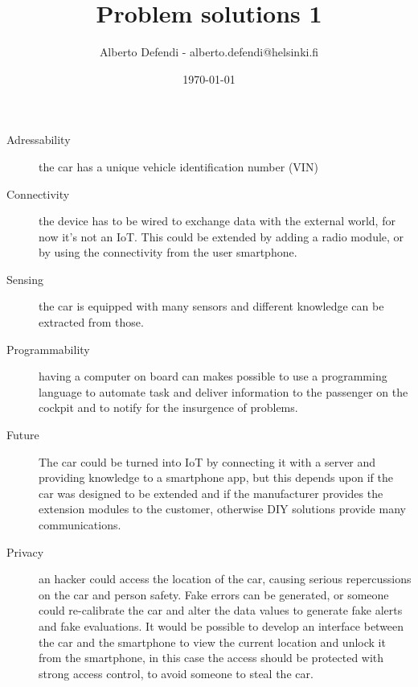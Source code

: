 \documentclass[a4paper, 12pt]{article}
\title{Problem solutions 1}
\author{Alberto Defendi - alberto.defendi@helsinki.fi}
\date{\today}
\begin{document}
\maketitle

\section{} %
\label{sec:}
\subsection{} %
\label{sub:}

\begin{description}
	\item[Adressability] the car has a unique vehicle identification number (VIN)
	\item[Connectivity] the device has to be wired to exchange data with the
		external world, for now it's not an IoT. This could be extended by
		adding a radio module, or by using the connectivity from the user
		smartphone. 
	\item[Sensing] the car is equipped with many sensors and different knowledge
		can be extracted from those.
    \item[Programmability] having a computer on board can makes possible to use
		a programming language to automate task and deliver information to the
		passenger on the cockpit and to notify for the insurgence of problems. 
	\item[Future] The car could be turned into IoT by connecting it with a
		server and providing knowledge to a smartphone app, but this depends
		upon if the car was designed to be extended and if the manufacturer
		provides the extension modules to the customer, otherwise DIY solutions
		provide many communications. 
	\item[Privacy] an hacker could access the location of the car, causing
		serious repercussions on the car and person safety. Fake
		errors can be generated, or someone could re-calibrate the car and alter 
		the data values to generate fake alerts and fake evaluations. 
		It would be possible to develop an interface between the car and the
		smartphone to view the current location and unlock it from the
		smartphone, in this case the access should be protected with strong
		access control, to avoid someone to steal the car.  
\end{description}

\end{document}
